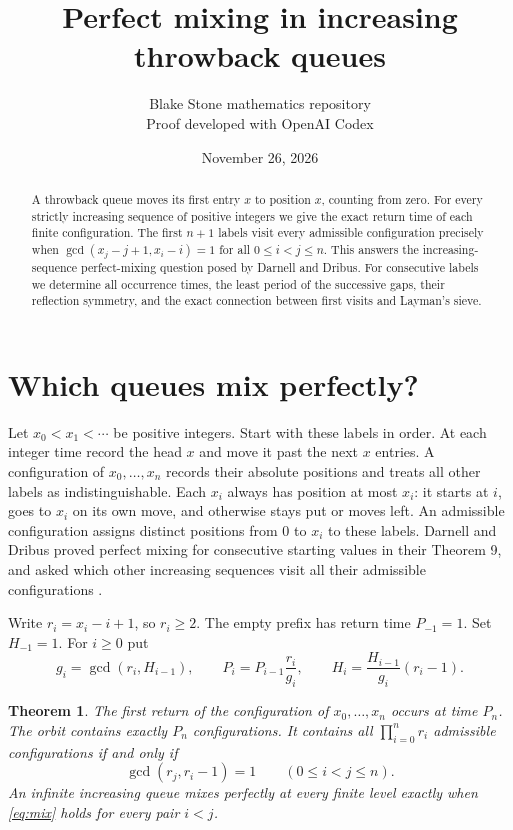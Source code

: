 \documentclass[11pt]{article}
\title{Perfect mixing in increasing throwback queues}
\author{Blake Stone mathematics repository\\[-2pt]\small Proof developed with OpenAI Codex}
\date{November 26, 2026}
\newtheorem{theorem}{Theorem}
\begin{document}
\maketitle
\begin{abstract}
A throwback queue moves its first entry $x$ to position $x$, counting from zero.
For every strictly increasing sequence of positive integers we give the exact
return time of each finite configuration. The first $n+1$ labels visit every
admissible configuration precisely when $\gcd(x_j-j+1,x_i-i)=1$ for all
$0\le i<j\le n$. This answers the increasing-sequence perfect-mixing question
posed by Darnell and Dribus. For consecutive labels we determine all occurrence
times, the least period of the successive gaps, their reflection symmetry, and
the exact connection between first visits and Layman's sieve.
\end{abstract}

\section{Which queues mix perfectly?}
Let $x_0<x_1<\cdots$ be positive integers. Start with these labels in order.
At each integer time record the head $x$ and move it past the next $x$ entries.
A configuration of $x_0,\ldots,x_n$ records their absolute positions and
treats all other labels as indistinguishable. Each $x_i$ always has position at
most $x_i$: it starts at $i$, goes to $x_i$ on its own move, and otherwise
stays put or moves left. An admissible configuration assigns distinct positions
from $0$ to $x_i$ to these labels. Darnell and Dribus proved perfect mixing
for consecutive starting values in their Theorem 9, and asked which other
increasing sequences visit all their admissible configurations
\cite[pp.\ 15--16]{dd}.

Write $r_i=x_i-i+1$, so $r_i\ge2$. The empty prefix has return time
$P_{-1}=1$. Set $H_{-1}=1$. For $i\ge0$ put
\begin{equation}
 g_i=\gcd(r_i,H_{i-1}),\qquad
 P_i=P_{i-1}\frac{r_i}{g_i},\qquad
 H_i=\frac{H_{i-1}}{g_i}(r_i-1).
 \label{eq:period}
\end{equation}
\begin{theorem}\label{thm:main}
The first return of the configuration of $x_0,\ldots,x_n$ occurs at time
$P_n$. The orbit contains exactly $P_n$ configurations. It contains all
$\prod_{i=0}^{n}r_i$ admissible configurations if and only if
\begin{equation}
 \gcd(r_j,r_i-1)=1\qquad(0\le i<j\le n).
 \label{eq:mix}
\end{equation}
An infinite increasing queue mixes perfectly at every finite level exactly when
\eqref{eq:mix} holds for every pair $i<j$.
\end{theorem}
\end{document}
